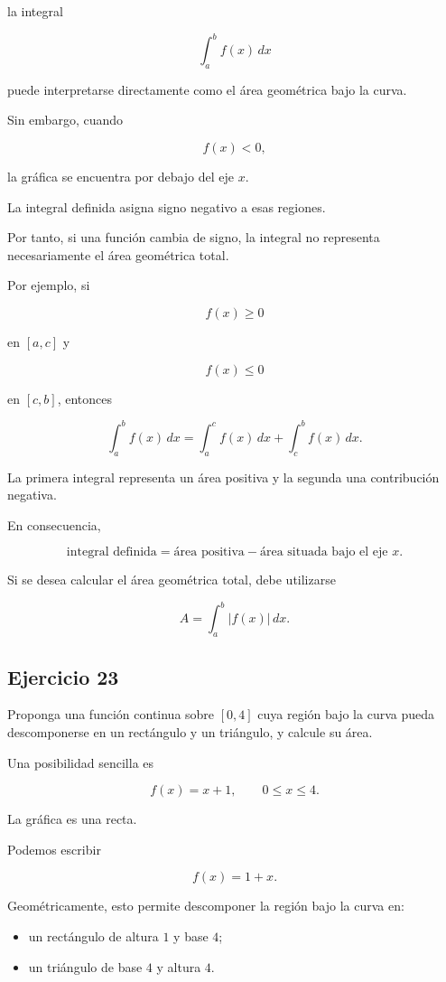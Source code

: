 \documentclass[12pt]{article}
\begin{document}
la integral

\[
\int_a^b f(x)\,dx
\]

puede interpretarse directamente como el área geométrica bajo la curva.

Sin embargo, cuando

\[
f(x)<0,
\]

la gráfica se encuentra por debajo del eje \(x\).

La integral definida asigna signo negativo a esas regiones.

Por tanto, si una función cambia de signo, la integral no representa
necesariamente el área geométrica total.

Por ejemplo, si

\[
f(x)\geq0
\]

en \([a,c]\) y

\[
f(x)\leq0
\]

en \([c,b]\), entonces

\[
\int_a^b f(x)\,dx
=
\int_a^c f(x)\,dx
+
\int_c^b f(x)\,dx.
\]

La primera integral representa un área positiva y la segunda una
contribución negativa.

En consecuencia,

\[
\boxed{
\text{integral definida}
=
\text{área positiva}
-
\text{área situada bajo el eje }x
}.
\]

Si se desea calcular el área geométrica total, debe utilizarse

\[
\boxed{
A=
\int_a^b |f(x)|\,dx
}.
\]

\subsection*{Ejercicio 23}

Proponga una función continua sobre \([0,4]\) cuya región bajo la curva
pueda descomponerse en un rectángulo y un triángulo, y calcule su área.

Una posibilidad sencilla es

\[
f(x)=x+1,
\qquad 0\leq x\leq4.
\]

La gráfica es una recta.

Podemos escribir

\[
f(x)=1+x.
\]

Geométricamente, esto permite descomponer la región bajo la curva en:

\begin{itemize}
    \item un rectángulo de altura \(1\) y base \(4\);
    \item un triángulo de base \(4\) y altura \(4\).
\end{itemize}
\end{document}
